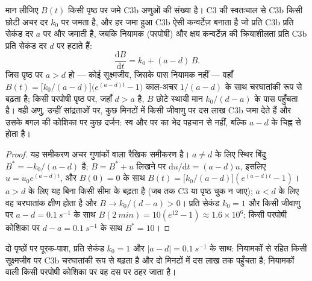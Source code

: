 \begin{theorem}[गतिक विभेदक के रूप में पूरक-पाश]\label{thm:b3:innate-immunity:complement}
मान लीजिए $B(t)$ किसी पृष्ठ पर जमे C3b अणुओं की संख्या है। C3 की
स्वतःचाल से C3b किसी छोटी अचर दर $k_{0}$ पर जमता है, और हर जमा हुआ
C3b ऐसी कन्वर्टेज़ बनाता है जो प्रति C3b प्रति सेकंड दर $a$ पर और जमाती
है, जबकि नियामक (परपोषी) और क्षय कन्वर्टेज़ की क्रियाशीलता प्रति C3b
प्रति सेकंड दर $d$ पर हटाते हैं:
\[
\frac{\mathrm{d}B}{\mathrm{d}t} = k_{0} + (a - d)\,B .
\]
जिस पृष्ठ पर $a > d$ हो --- कोई सूक्ष्मजीव, जिसके पास नियामक नहीं ---
वहाँ $B(t) = \bigl[k_{0}/(a-d)\bigr]\bigl(e^{(a-d)t} - 1\bigr)$ काल-अचर
$1/(a - d)$ के साथ चरघातांकी रूप से बढ़ता है; किसी परपोषी पृष्ठ पर,
जहाँ $d > a$ है, $B$ छोटे स्थायी मान $k_{0}/(d - a)$ के पास पहुँचता
है। वही अणु, उन्हीं सांद्रताओं पर, कुछ मिनटों में किसी जीवाणु पर दस
लाख C3b जमा देते हैं और उसके बगल की कोशिका पर कुछ दर्जन: स्व और पर का
भेद पहचान से नहीं, बल्कि $a - d$ के चिह्न से होता है।
\end{theorem}
\begin{proof}
यह समीकरण अचर गुणांकों वाला रैखिक समीकरण है। $a \ne d$ के लिए स्थिर
बिंदु $B^{*} = -k_{0}/(a-d)$ है; $B = B^{*} + u$ लिखने पर
$\mathrm{d}u/\mathrm{d}t = (a-d)u$, इसलिए $u = u_{0}e^{(a-d)t}$, और
$B(0) = 0$ के साथ $B(t) = \bigl[k_{0}/(a-d)\bigr](e^{(a-d)t} - 1)$। $a > d$
के लिए यह बिना किसी सीमा के बढ़ता है (जब तक C3 या पृष्ठ चुक न जाए);
$a < d$ के लिए वह चरघातांक क्षीण होता है और $B \to k_{0}/(d-a) > 0$।
प्रति सेकंड $k_{0} = 1$ और किसी जीवाणु पर $a - d = \qty{0.1}{s^{-1}}$
के साथ $B(\qty{2}{min})
= 10(e^{12} - 1) \approx 1.6\times 10^{6}$; किसी परपोषी कोशिका पर $d - a =
\qty{0.1}{s^{-1}}$ के साथ $B^{*} = 10$।
\end{proof}

\begin{omfigure}

{\small दो पृष्ठों पर पूरक-पाश, प्रति सेकंड $k_{0} = 1$ और
$|a - d| = \qty{0.1}{s^{-1}}$ के साथ: नियामकों से रहित किसी
सूक्ष्मजीव पर C3b चरघातांकी रूप से बढ़ता है और दो मिनटों में दस लाख तक
पहुँचता है; नियामकों वाली किसी परपोषी कोशिका पर वह दस पर ठहर जाता है।}
\end{omfigure}

